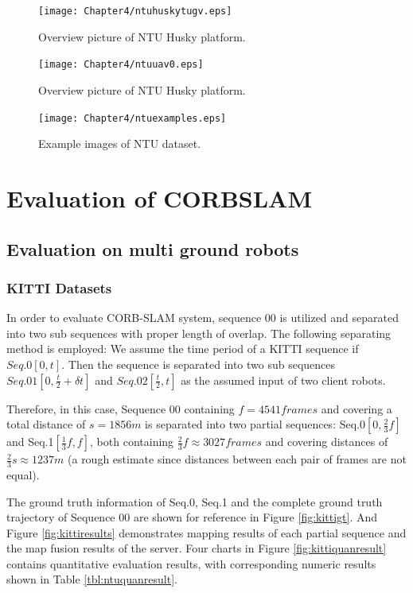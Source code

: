 \begin{figure}[H]
	\centering
	\texttt{[image: Chapter4/ntuhuskytugv.eps]}
	\caption{Overview picture of NTU Husky platform.}
	\label{fig:ntuugvplatform} 
\end{figure}

\begin{figure}[H]
	\centering
	\texttt{[image: Chapter4/ntuuav0.eps]}
	\caption{Overview picture of NTU Husky platform.}
	\label{fig:ntuuavplatform} 
\end{figure}

\begin{figure}[H]
	\centering
	\texttt{[image: Chapter4/ntuexamples.eps]}
	\caption{Example images of NTU dataset.}
	\label{fig:ntuexamples} 
\end{figure}

\section{Evaluation of CORBSLAM}
\subsection{Evaluation on multi ground robots}

\subsubsection{KITTI Datasets}
\label{sec:kittievaluate}
In order to evaluate CORB-SLAM system, sequence 00 is utilized and separated into two sub sequences with proper length of overlap. The following separating method is employed: We assume the time period of a KITTI sequence if $Seq.0[0,t]$. Then the sequence is separated into two sub sequences $Seq.01[0,\frac{t}{2}+\delta{t}]$ and $Seq.02[\frac{t}{2},t]$ as the assumed input of two client robots. 

Therefore, in this case, Sequence 00 containing $f=4541frames$ and covering a total distance of $s=1856m$ is separated into two partial sequences: Seq.0$[0, \frac{2}{3}f]$ and Seq.1$[\frac{1}{3}f, f]$, both containing  $\frac{2}{3}f\approx{3027frames}$ and covering distances of $\frac{2}{3}s\approx{1237m}$ (a rough estimate since distances between each pair of frames are not equal). 

The ground truth information of Seq.0, Seq.1 and the complete ground truth trajectory of Sequence 00 are shown for reference in Figure \ref{fig:kittigt}. And Figure \ref{fig:kittiresults} demonstrates mapping results of each partial sequence and the map fusion results of the server. Four charts in Figure \ref{fig:kittiquanresult} contains quantitative evaluation results, with corresponding numeric results shown in Table \ref{tbl:ntuquanresult}.

